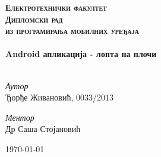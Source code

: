 

\begin{titlepage}

\begin{center}



\textsc{\Huge \textbf{Електротехнички факултет}}\\[5cm]

\textsc{\Huge \textbf{Дипломски рад }}\\[0.5cm]
\textsc{\large{\textbf{из програмирања мобилних уређаја}}}
\\[4cm]

\HRule \\[0.8cm]
{ \Huge \bfseries Android апликација - лопта на плочи}\\[0.4cm]

\HRule \\[5cm]

\begin{minipage}{0.55\textwidth}
\begin{flushleft} \large
\emph{Аутор}\\
Ђорђе Живановић, 0033/2013\\
\end{flushleft}
\end{minipage}
\begin{minipage}{0.4\textwidth}
\begin{flushright} \large
\emph{Ментор} \\
Др Саша Стојановић
\end{flushright}
\end{minipage}



\vfill

{\large \today}

\end{center}

\end{titlepage}